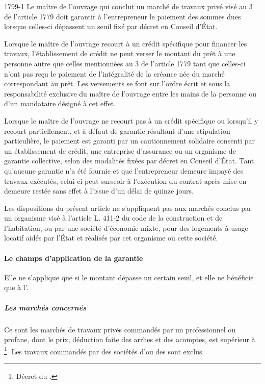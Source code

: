 				\begin{citationArticleCciv}{1799-1}
					Le maître de l'ouvrage qui conclut un marché de travaux privé visé au 3\degres{} de l'article 1779 doit garantir à l'entrepreneur le paiement des sommes dues lorsque celles-ci dépassent un seuil fixé par décret en Conseil d'État.

					Lorsque le maître de l'ouvrage recourt à un crédit spécifique pour financer les travaux, l'établissement de crédit ne peut verser le montant du prêt à une personne autre que celles mentionnées au 3\degres{}  de l'article 1779 tant que celles-ci n'ont pas reçu le paiement de l'intégralité de la créance née du marché correspondant au prêt. Les versements se font sur l'ordre écrit et sous la responsabilité exclusive du maître de l'ouvrage entre les mains de la personne ou d'un mandataire désigné à cet effet.

					Lorsque le maître de l'ouvrage ne recourt pas à un crédit spécifique ou lorsqu'il y recourt partiellement, et à défaut de garantie résultant d'une stipulation particulière, le paiement est garanti par un cautionnement solidaire consenti par un établissement de crédit, une entreprise d'assurance ou un organisme de garantie collective, selon des modalités fixées par décret en Conseil d'État. Tant qu'aucune garantie n'a été fournie et que l'entrepreneur demeure impayé des travaux exécutés, celui-ci peut surseoir à l'exécution du contrat après mise en demeure restée sans effet à l'issue d'un délai de quinze jours.

					Les dispositions du présent article ne s'appliquent pas aux marchés conclus par un organisme visé à l'article L. 411-2 du code de la construction et de l'habitation, ou par une société d'économie mixte, pour des logements à usage locatif aidés par l'État et réalisés par cet organisme ou cette société.
				\end{citationArticleCciv}

				\paragraph{Le champs d'application de la garantie}

					Elle ne s'applique que si le montant dépasse un certain seuil, et elle ne bénéficie que à l'\E.

					\subparagraph{Les marchés concernés} Ce sont les marchés de travaux privés commandés par un \Mo professionnel ou profane, dont le prix, déduction faite des arrhes et des acomptes, est supérieur à \footnote{Décret du .}. Les travaux commandés par des sociétés d'\HLM ou des \SEM sont exclus.

